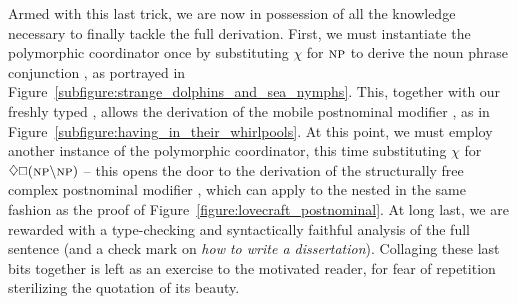 Armed with this last trick, we are now in possession of all the knowledge necessary to finally tackle the full derivation.
First, we must instantiate the polymorphic coordinator once by substituting $\chi$ for $\np[s]$ to derive the noun phrase conjunction , as portrayed in Figure~\ref{subfigure:strange_dolphins_and_sea_nymphs}.
This, together with our freshly typed , allows the derivation of the mobile postnominal modifier , as in Figure~\ref{subfigure:having_in_their_whirlpools}.
At this point, we must employ another instance of the polymorphic coordinator, this time substituting $\chi$ for $\diamond\bx (\np\divleft\np[s])$ -- this opens the door to the derivation of the structurally free complex postnominal modifier , which can apply to the nested  in the same fashion as the proof of Figure~\ref{figure:lovecraft_postnominal}.
At long last, we are rewarded with a type-checking and syntactically faithful analysis of the full sentence (and a check mark on \textit{how to write a dissertation}).
Collaging these last bits together is left as an exercise to the motivated reader, for fear of repetition sterilizing the quotation of its beauty.

